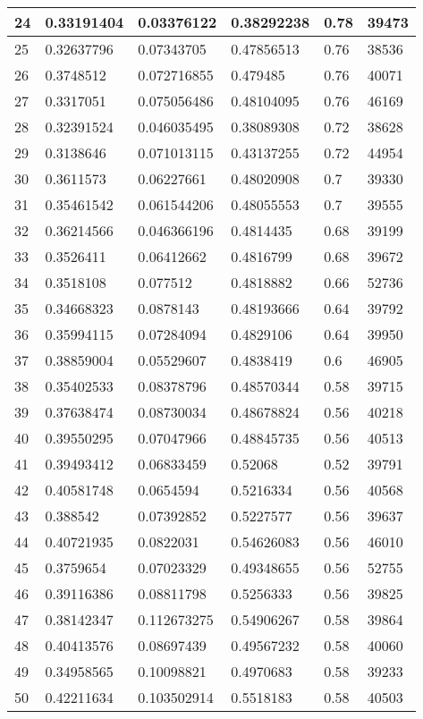 \begin{longtable}{|l|l|l|l|l|l|}
24 & 0.33191404 & 0.03376122 & 0.38292238 & 0.78 & 39473 \\ \hline 
25 & 0.32637796 & 0.07343705 & 0.47856513 & 0.76 & 38536 \\ \hline 
26 & 0.3748512 & 0.072716855 & 0.479485 & 0.76 & 40071 \\ \hline 
27 & 0.3317051 & 0.075056486 & 0.48104095 & 0.76 & 46169 \\ \hline 
28 & 0.32391524 & 0.046035495 & 0.38089308 & 0.72 & 38628 \\ \hline 
29 & 0.3138646 & 0.071013115 & 0.43137255 & 0.72 & 44954 \\ \hline 
30 & 0.3611573 & 0.06227661 & 0.48020908 & 0.7 & 39330 \\ \hline 
31 & 0.35461542 & 0.061544206 & 0.48055553 & 0.7 & 39555 \\ \hline 
32 & 0.36214566 & 0.046366196 & 0.4814435 & 0.68 & 39199 \\ \hline 
33 & 0.3526411 & 0.06412662 & 0.4816799 & 0.68 & 39672 \\ \hline 
34 & 0.3518108 & 0.077512 & 0.4818882 & 0.66 & 52736 \\ \hline 
35 & 0.34668323 & 0.0878143 & 0.48193666 & 0.64 & 39792 \\ \hline 
36 & 0.35994115 & 0.07284094 & 0.4829106 & 0.64 & 39950 \\ \hline 
37 & 0.38859004 & 0.05529607 & 0.4838419 & 0.6 & 46905 \\ \hline 
38 & 0.35402533 & 0.08378796 & 0.48570344 & 0.58 & 39715 \\ \hline 
39 & 0.37638474 & 0.08730034 & 0.48678824 & 0.56 & 40218 \\ \hline 
40 & 0.39550295 & 0.07047966 & 0.48845735 & 0.56 & 40513 \\ \hline 
41 & 0.39493412 & 0.06833459 & 0.52068 & 0.52 & 39791 \\ \hline 
42 & 0.40581748 & 0.0654594 & 0.5216334 & 0.56 & 40568 \\ \hline 
43 & 0.388542 & 0.07392852 & 0.5227577 & 0.56 & 39637 \\ \hline 
44 & 0.40721935 & 0.0822031 & 0.54626083 & 0.56 & 46010 \\ \hline 
45 & 0.3759654 & 0.07023329 & 0.49348655 & 0.56 & 52755 \\ \hline 
46 & 0.39116386 & 0.08811798 & 0.5256333 & 0.56 & 39825 \\ \hline 
47 & 0.38142347 & 0.112673275 & 0.54906267 & 0.58 & 39864 \\ \hline 
48 & 0.40413576 & 0.08697439 & 0.49567232 & 0.58 & 40060 \\ \hline 
49 & 0.34958565 & 0.10098821 & 0.4970683 & 0.58 & 39233 \\ \hline 
50 & 0.42211634 & 0.103502914 & 0.5518183 & 0.58 & 40503 \\ \hline 
\end{longtable}